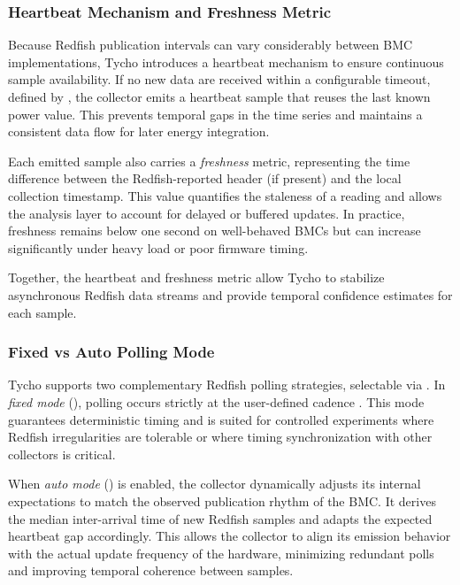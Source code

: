 \subsubsection{Heartbeat Mechanism and Freshness Metric}
\label{subsubsec:redfish_heartbeat}

Because Redfish publication intervals can vary considerably between BMC implementations, Tycho introduces a heartbeat mechanism to ensure continuous sample availability.  
If no new data are received within a configurable timeout, defined by , the collector emits a heartbeat sample that reuses the last known power value.  
This prevents temporal gaps in the time series and maintains a consistent data flow for later energy integration.

Each emitted sample also carries a \emph{freshness} metric, representing the time difference between the Redfish-reported  header (if present) and the local collection timestamp.  
This value quantifies the staleness of a reading and allows the analysis layer to account for delayed or buffered updates.  
In practice, freshness remains below one second on well-behaved BMCs but can increase significantly under heavy load or poor firmware timing.

Together, the heartbeat and freshness metric allow Tycho to stabilize asynchronous Redfish data streams and provide temporal confidence estimates for each sample.

\subsubsection{Fixed vs Auto Polling Mode}
\label{subsubsec:redfish_autopoll}

Tycho supports two complementary Redfish polling strategies, selectable via .  
In \emph{fixed mode} (), polling occurs strictly at the user-defined cadence .  
This mode guarantees deterministic timing and is suited for controlled experiments where Redfish irregularities are tolerable or where timing synchronization with other collectors is critical.  

When \emph{auto mode} () is enabled, the collector dynamically adjusts its internal expectations to match the observed publication rhythm of the BMC.  
It derives the median inter-arrival time of new Redfish samples and adapts the expected heartbeat gap accordingly.  
This allows the collector to align its emission behavior with the actual update frequency of the hardware, minimizing redundant polls and improving temporal coherence between samples.


